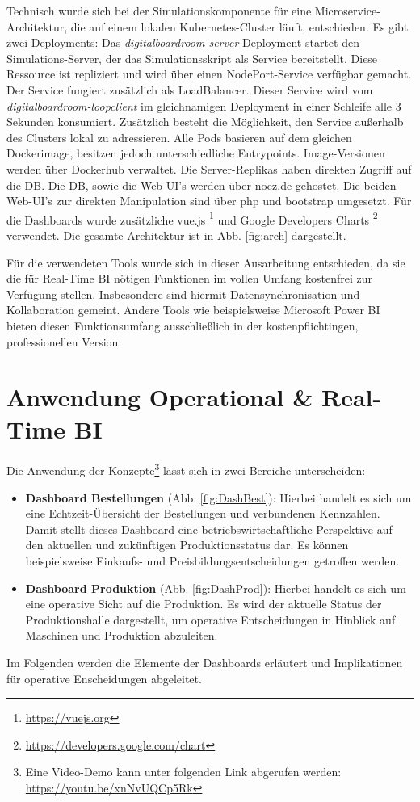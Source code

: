 Technisch wurde sich bei der Simulationskomponente für eine Microservice-Architektur, die auf einem lokalen Kubernetes-Cluster läuft, entschieden. Es gibt zwei Deployments: Das \textit{digitalboardroom-server} Deployment startet den Simulations-Server, der das Simulationsskript als Service bereitstellt. Diese Ressource ist repliziert und wird über einen NodePort-Service verfügbar gemacht. Der Service fungiert zusätzlich als LoadBalancer. Dieser Service wird vom \textit{digitalboardroom-loopclient} im gleichnamigen Deployment in einer Schleife alle 3 Sekunden konsumiert. Zusätzlich besteht die Möglichkeit, den Service außerhalb des Clusters lokal zu adressieren. Alle Pods basieren auf dem gleichen Dockerimage, besitzen jedoch unterschiedliche Entrypoints. Image-Versionen werden über Dockerhub verwaltet. Die Server-Replikas haben direkten Zugriff auf die \ac{DB}.
Die \ac{DB}, sowie die Web-UI's werden über noez.de gehostet. Die beiden Web-UI's zur direkten Manipulation sind über php und bootstrap umgesetzt. Für die Dashboards wurde zusätzliche vue.js \footnote{\url{https://vuejs.org}} und Google Developers Charts \footnote{\url{https://developers.google.com/chart}} verwendet. Die gesamte Architektur ist in Abb. \ref{fig:arch} dargestellt.

Für die verwendeten Tools wurde sich in dieser Ausarbeitung entschieden, da sie die für Real-Time \ac{BI} nötigen Funktionen im vollen Umfang kostenfrei zur Verfügung stellen. Insbesondere sind hiermit Datensynchronisation und Kollaboration gemeint. Andere Tools wie beispielsweise Microsoft Power BI bieten diesen Funktionsumfang ausschließlich in der kostenpflichtingen, professionellen Version.

\section{Anwendung Operational \& Real-Time BI} \label{abs:anwOP}
Die Anwendung der Konzepte\footnote{Eine Video-Demo kann unter folgenden Link abgerufen werden: \url{https://youtu.be/xnNvUQCp5Rk}} lässt sich in zwei Bereiche unterscheiden:
\begin{itemize}
    \item \textbf{Dashboard Bestellungen} (Abb. \ref{fig:DashBest}): Hierbei handelt es sich um eine Echtzeit-Übersicht der Bestellungen und verbundenen Kennzahlen. Damit stellt dieses Dashboard eine betriebswirtschaftliche Perspektive auf den aktuellen und zukünftigen Produktionsstatus dar. Es können beispielsweise Einkaufs- und Preisbildungsentscheidungen getroffen werden.
    \item \textbf{Dashboard Produktion} (Abb. \ref{fig:DashProd}): Hierbei handelt es sich um eine operative Sicht auf die Produktion. Es wird der aktuelle Status der Produktionshalle dargestellt, um operative Entscheidungen in Hinblick auf Maschinen und Produktion abzuleiten.
\end{itemize}
Im Folgenden werden die Elemente der Dashboards erläutert und Implikationen für operative Enscheidungen abgeleitet.

